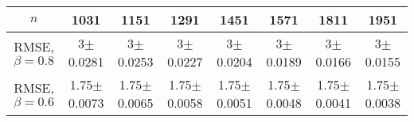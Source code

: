\begin{tabular}{|c|c|c|c|c|c|c|c|}\hline 
$n$ & 1031 & 1151 & 1291 & 1451 & 1571 & 1811 & 1951 \\ \hline 
RMSE, $\beta=0.8$ & 3$\pm$0.0281 & 3$\pm$0.0253 & 3$\pm$0.0227 & 3$\pm$0.0204 & 3$\pm$0.0189 & 3$\pm$0.0166 & 3$\pm$0.0155  \\ \hline 
RMSE, $\beta=0.6$ & 1.75$\pm$0.0073 & 1.75$\pm$0.0065 & 1.75$\pm$0.0058 & 1.75$\pm$0.0051 & 1.75$\pm$0.0048 & 1.75$\pm$0.0041 & 1.75$\pm$0.0038  \\ \hline 
\end{tabular}
